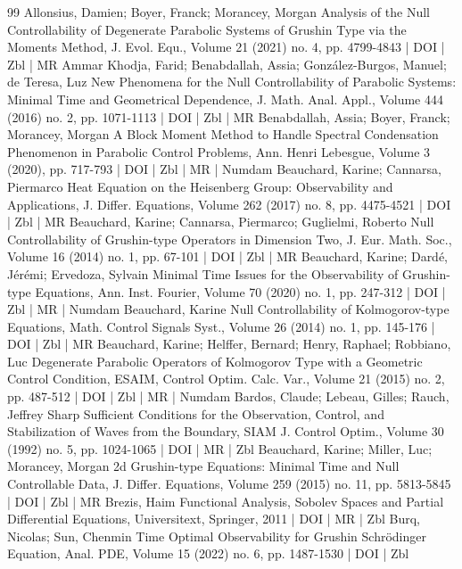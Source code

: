 \documentclass[10pt]{amsart}
\theoremstyle{definition}\newtheorem{defi}[theo]{Definition}\newtheorem{rema}[theo]{Remark}\newtheorem{exam}[theo]{Example}\newtheorem{exem}[theo]{Example}\newtheorem{nota}[theo]{Notation}
\newcommand{\1}{\mathds 1}
\begin{document}
\begin{thebibliography}{99}
Allonsius, Damien; Boyer, Franck; Morancey, Morgan Analysis of the Null Controllability of Degenerate Parabolic Systems of Grushin Type via the Moments Method, J. Evol. Equ., Volume 21 (2021) no. 4, pp. 4799-4843 | DOI | Zbl | MR
Ammar Khodja, Farid; Benabdallah, Assia; González-Burgos, Manuel; de Teresa, Luz New Phenomena for the Null Controllability of Parabolic Systems: Minimal Time and Geometrical Dependence, J. Math. Anal. Appl., Volume 444 (2016) no. 2, pp. 1071-1113 | DOI | Zbl | MR
Benabdallah, Assia; Boyer, Franck; Morancey, Morgan A Block Moment Method to Handle Spectral Condensation Phenomenon in Parabolic Control Problems, Ann. Henri Lebesgue, Volume 3 (2020), pp. 717-793 | DOI | Zbl | MR | Numdam
Beauchard, Karine; Cannarsa, Piermarco Heat Equation on the Heisenberg Group: Observability and Applications, J. Differ. Equations, Volume 262 (2017) no. 8, pp. 4475-4521 | DOI | Zbl | MR
Beauchard, Karine; Cannarsa, Piermarco; Guglielmi, Roberto Null Controllability of Grushin-type Operators in Dimension Two, J. Eur. Math. Soc., Volume 16 (2014) no. 1, pp. 67-101 | DOI | Zbl | MR
Beauchard, Karine; Dardé, Jérémi; Ervedoza, Sylvain Minimal Time Issues for the Observability of Grushin-type Equations, Ann. Inst. Fourier, Volume 70 (2020) no. 1, pp. 247-312 | DOI | Zbl | MR | Numdam
Beauchard, Karine Null Controllability of Kolmogorov-type Equations, Math. Control Signals Syst., Volume 26 (2014) no. 1, pp. 145-176 | DOI | Zbl | MR
Beauchard, Karine; Helffer, Bernard; Henry, Raphael; Robbiano, Luc Degenerate Parabolic Operators of Kolmogorov Type with a Geometric Control Condition, ESAIM, Control Optim. Calc. Var., Volume 21 (2015) no. 2, pp. 487-512 | DOI | Zbl | MR | Numdam
Bardos, Claude; Lebeau, Gilles; Rauch, Jeffrey Sharp Sufficient Conditions for the Observation, Control, and Stabilization of Waves from the Boundary, SIAM J. Control Optim., Volume 30 (1992) no. 5, pp. 1024-1065 | DOI | MR | Zbl
Beauchard, Karine; Miller, Luc; Morancey, Morgan 2d Grushin-type Equations: Minimal Time and Null Controllable Data, J. Differ. Equations, Volume 259 (2015) no. 11, pp. 5813-5845 | DOI | Zbl | MR
Brezis, Haim Functional Analysis, Sobolev Spaces and Partial Differential Equations, Universitext, Springer, 2011 | DOI | MR | Zbl
Burq, Nicolas; Sun, Chenmin Time Optimal Observability for Grushin Schrödinger Equation, Anal. PDE, Volume 15 (2022) no. 6, pp. 1487-1530 | DOI | Zbl

\end{thebibliography}
\end{document}

